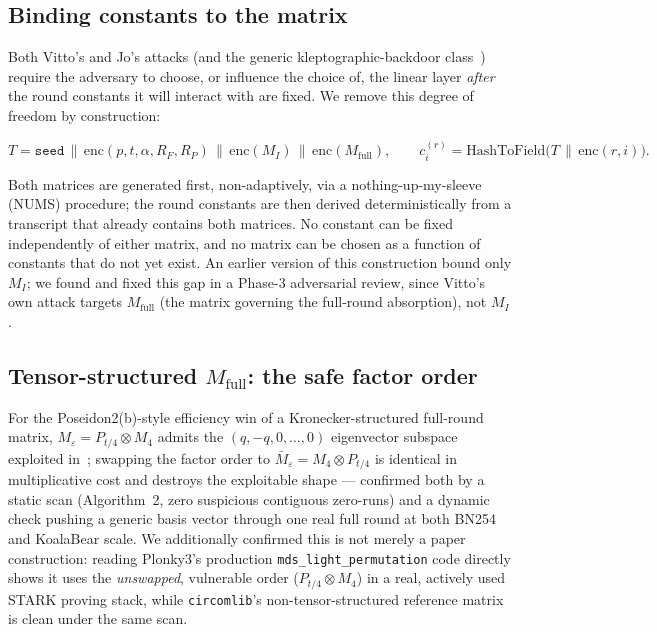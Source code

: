 \documentclass[11pt]{article}
\newcommand{\MI}{M_{I}}
\newcommand{\Mfull}{M_{\mathrm{full}}}
\begin{document}
\subsection{Binding constants to the matrix}

Both Vitto's and Jo's attacks (and the generic kleptographic-backdoor
class~\cite{backdoor2026}) require the adversary to choose, or influence
the choice of, the linear layer \emph{after} the round constants it will
interact with are fixed. We remove this degree of freedom by construction:

\[
  T = \texttt{seed} \,\|\, \mathrm{enc}(p,t,\alpha,R_F,R_P) \,\|\, \mathrm{enc}(\MI) \,\|\, \mathrm{enc}(\Mfull),
  \qquad
  c^{(r)}_i = \mathrm{HashToField}\big(T \,\|\, \mathrm{enc}(r,i)\big).
\]

Both matrices are generated first, non-adaptively, via a
nothing-up-my-sleeve (NUMS) procedure; the round constants are then
derived deterministically from a transcript that already contains both
matrices. No constant can be fixed independently of either matrix, and no
matrix can be chosen as a function of constants that do not yet exist.
An earlier version of this construction bound only $\MI$; we found and
fixed this gap in a Phase-3 adversarial review, since Vitto's own attack
targets $\Mfull$ (the matrix governing the full-round absorption), not
$\MI$.

\subsection{Tensor-structured $\Mfull$: the safe factor order}
\label{sec:tensor}

For the Poseidon2(b)-style efficiency win of a Kronecker-structured
full-round matrix, $M_\varepsilon = P_{t/4}\otimes M_4$ admits the
$(q,-q,0,\dots,0)$ eigenvector subspace exploited
in~\cite{merzgarcia2026}; swapping the factor order to
$\bar M_\varepsilon = M_4 \otimes P_{t/4}$ is identical in multiplicative
cost and destroys the exploitable shape --- confirmed both by a static
scan (Algorithm~2, zero suspicious contiguous zero-runs) and a dynamic
check pushing a generic basis vector through one real full round at both
BN254 and KoalaBear scale. We additionally confirmed this is not merely a
paper construction: reading Plonky3's production
\texttt{mds\_light\_permutation} code directly shows it uses the
\emph{unswapped}, vulnerable order ($P_{t/4}\otimes M_4$) in a real,
actively used STARK proving stack, while \texttt{circomlib}'s
non-tensor-structured reference matrix is clean under the same scan.
\end{document}
